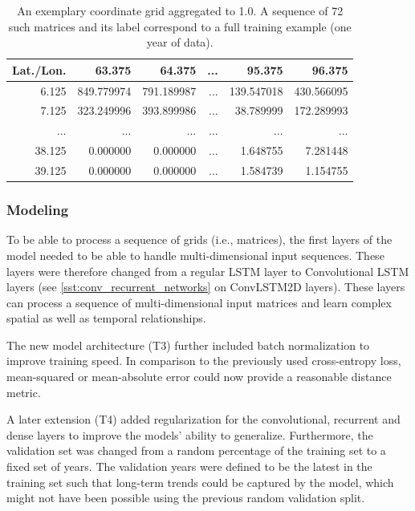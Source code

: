 \begin{table}[h]
  \centering
  \begin{tabular}{|r||rrrrr|}
    \hline
    Lat./Lon. & 63.375 & 64.375 & ... & 95.375 & 96.375 \\
    \hline
    \hline
    6.125 & 849.779974 & 791.189987 & ... & 139.547018 & 430.566095 \\
    7.125 & 323.249996 & 393.899986 & ... & 38.789999 & 172.289993 \\
    ... & ... & ... & ... & ... & ...\\
    38.125 & 0.000000 & 0.000000 & ... & 1.648755 & 7.281448 \\
    39.125 & 0.000000 & 0.000000 & ... & 1.584739 & 1.154755 \\
    \hline
  \end{tabular}
  \caption{An exemplary coordinate grid aggregated to 1.0\degree. A sequence of 72 such matrices and its label correspond to a full training example (one year of data).}
  \label{tab:nn_t3_data}
\end{table}

\subsubsection{Modeling}
\label{ssst:nn_t3_model}
To be able to process a sequence of grids (i.e., matrices), the first layers of the model needed to be able to handle multi-dimensional input sequences. These layers were therefore changed from a regular LSTM layer to Convolutional LSTM layers (see \cref{sst:conv_recurrent_networks} on ConvLSTM2D layers). These layers can process a sequence of multi-dimensional input matrices and learn complex spatial as well as temporal relationships.

The new model architecture (T3) further included batch normalization to improve training speed. In comparison to the previously used cross-entropy loss, mean-squared or mean-absolute error could now provide a reasonable distance metric.

A later extension (T4) added regularization for the convolutional, recurrent and dense layers to improve the models' ability to generalize. Furthermore, the validation set was changed from a random percentage of the training set to a fixed set of years. The validation years were defined to be the latest in the training set such that long-term trends could be captured by the model, which might not have been possible using the previous random validation split.

